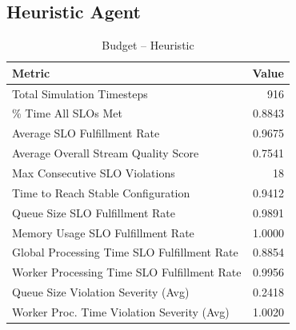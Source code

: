 \subsection*{Heuristic Agent}
\begin{table}[h]
\centering
\caption{Budget – Heuristic}
\label{tab:budget_heuristic}
\begin{tabular}{lr}
\toprule
Metric & Value \\
\midrule
Total Simulation Timesteps & 916 \\
\% Time All SLOs Met & 0.8843 \\
Average SLO Fulfillment Rate & 0.9675 \\
Average Overall Stream Quality Score & 0.7541 \\
Max Consecutive SLO Violations & 18 \\
Time to Reach Stable Configuration & 0.9412 \\
Queue Size SLO Fulfillment Rate & 0.9891 \\
Memory Usage SLO Fulfillment Rate & 1.0000 \\
Global Processing Time SLO Fulfillment Rate & 0.8854 \\
Worker Processing Time SLO Fulfillment Rate & 0.9956 \\
Queue Size Violation Severity (Avg) & 0.2418 \\
Worker Proc. Time Violation Severity (Avg) & 1.0020 \\
\bottomrule
\end{tabular}
\end{table}


